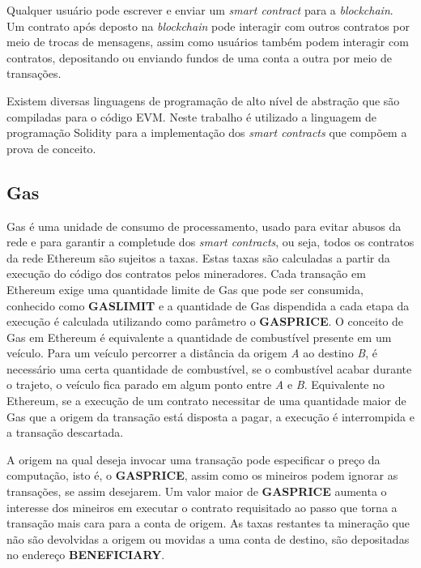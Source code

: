 \documentclass[tcc,capa]{texufpel}
\begin{document}
	Qualquer usuário pode escrever e enviar um \textit{smart contract} para a \textit{blockchain}. Um contrato após deposto na \textit{blockchain} pode interagir com outros contratos por meio de trocas de mensagens, assim como usuários também podem interagir com contratos, depositando ou enviando fundos de uma conta a outra por meio de transações.
	
	Existem diversas linguagens de programação de alto nível de abstração que são compiladas para o código EVM. Neste trabalho é utilizado a linguagem de programação Solidity \cite{dannen2017introducing} para a implementação dos \textit{smart contracts} que compõem a prova de conceito.


	\subsection{Gas}
	
	Gas é uma unidade de consumo de processamento, usado para evitar abusos da rede e para garantir a completude dos \textit{smart contracts}, ou seja, todos os contratos da rede Ethereum são sujeitos a taxas. Estas taxas são calculadas a partir da execução do código dos contratos pelos mineradores. Cada transação em Ethereum exige uma quantidade limite de Gas que pode ser consumida, conhecido como \textbf{GASLIMIT} e a quantidade de Gas dispendida a cada etapa da execução é calculada utilizando como parâmetro o \textbf{GASPRICE}. O conceito de Gas em Ethereum é equivalente a quantidade de combustível presente em um veículo. Para um veículo percorrer a distância da origem \textit{A} ao destino \textit{B}, é necessário uma certa quantidade de combustível, se o combustível acabar durante o trajeto, o veículo fica parado em algum ponto entre \textit{A} e  \textit{B}. Equivalente no Ethereum, se a execução de um contrato necessitar de uma quantidade maior de Gas que a origem da transação está disposta a pagar, a execução é interrompida e a transação descartada.
	
	A origem na qual deseja invocar uma transação pode especificar o preço da computação, isto é, o \textbf{GASPRICE}, assim como os mineiros podem ignorar as transações, se assim desejarem. Um valor maior de \textbf{GASPRICE} aumenta o interesse dos mineiros em executar o contrato requisitado ao passo que torna a transação mais cara para a conta de origem. As taxas restantes ta mineração que não são devolvidas a origem ou movidas a uma conta de destino, são depositadas no endereço \textbf{BENEFICIARY}.
\end{document}
